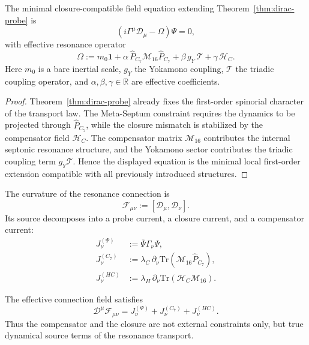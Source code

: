 \begin{theorem}
\label{thm:master-field-equation}
The minimal closure-compatible field equation extending
Theorem~\ref{thm:dirac-probe} is
\[
 \left(
 i\Gamma^\mu\mathcal D_\mu
 - \Omega
 \right)\Psi = 0,
\]
with effective resonance operator
\[
 \Omega
 :=
 m_0\mathbf 1
 + \alpha\,\hat P_{C_7}\mathcal M_{16}\hat P_{C_7}
 + \beta\,g_Y\,\mathcal T
 + \gamma\,\mathcal H_C.
\]
Here $m_0$ is a bare inertial scale, $g_Y$ the Yokamono coupling,
$\mathcal T$ the triadic coupling operator, and
$\alpha,\beta,\gamma\in\mathbb R$ are effective coefficients.
\end{theorem}

\begin{proof}
Theorem~\ref{thm:dirac-probe} already fixes the first-order spinorial
character of the transport law.
The Meta-Septum constraint requires the dynamics to be projected through
$\hat P_{C_7}$, while the closure mismatch is stabilized by the
compensator field $\mathcal H_C$.
The compensator matrix $\mathcal M_{16}$ contributes the internal
septonic resonance structure, and the Yokamono sector contributes the
triadic coupling term $g_Y\mathcal T$.
Hence the displayed equation is the minimal local first-order extension
compatible with all previously introduced structures.
\end{proof}

\begin{definition}
The curvature of the resonance connection is
\[
 \mathcal F_{\mu\nu} := [\mathcal D_\mu,\mathcal D_\nu].
\]
Its source decomposes into a probe current, a closure current, and a
compensator current:
\begin{align*}
 J^{(\Psi)}_\nu &:= \bar\Psi\Gamma_\nu\Psi,\\
 J^{(C_7)}_\nu &:= \lambda_C\,\partial_\nu
 \mathrm{Tr}(\mathcal M_{16}\hat P_{C_7}),\\
 J^{(HC)}_\nu &:= \lambda_H\,\partial_\nu
 \mathrm{Tr}(\mathcal H_C\mathcal M_{16}).
\end{align*}
\end{definition}

\begin{theorem}
\label{thm:resonance-field-eq}
The effective connection field satisfies
\[
 \mathcal D^\mu\mathcal F_{\mu\nu}
 =
 J^{(\Psi)}_\nu + J^{(C_7)}_\nu + J^{(HC)}_\nu.
\]
Thus the compensator and the closure are not external constraints only,
but true dynamical source terms of the resonance transport.
\end{theorem}

